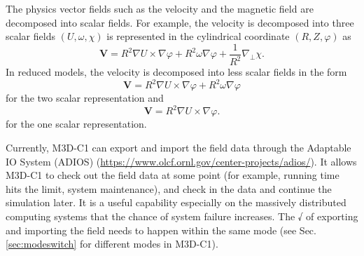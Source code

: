 \documentclass[11pt]{article}  %
\begin{document}
The physics vector fields such as the velocity and the magnetic field are decomposed into scalar fields. For example, the velocity is decomposed into three scalar fields $(U, \omega, \chi)$ \cite{jardin2012multiple} is represented in the cylindrical coordinate $(R,Z, \varphi)$ as
\begin{equation}
\mathbf{V}=R^2\nabla U \times \nabla \varphi + R^2\omega\nabla\varphi+\frac{1}{R^2}\nabla_\perp\chi. \label{3scalars}
\end{equation}
In reduced models, the velocity is decomposed into less scalar fields in the form
\begin{equation}
\mathbf{V}=R^2\nabla U \times \nabla \varphi + R^2\omega\nabla\varphi 
\end{equation}
for the two scalar representation and
\begin{equation}
\mathbf{V}=R^2\nabla U \times \nabla \varphi.
\end{equation}
for the one scalar representation.

Currently, M3D-C1 can export and import the field data through the Adaptable IO System (ADIOS) (\url{https://www.olcf.ornl.gov/center-projects/adios/}). It allows M3D-C1 to check out the field data at some point (for example, running time hits the limit, system maintenance), and check in the data and continue the simulation later. It is a useful capability especially on the massively distributed computing systems that the chance of system failure increases. The √ of exporting and importing the field needs to happen within the same mode (see Sec. \ref{sec:modeswitch} for different modes in M3D-C1). 
\end{document}
